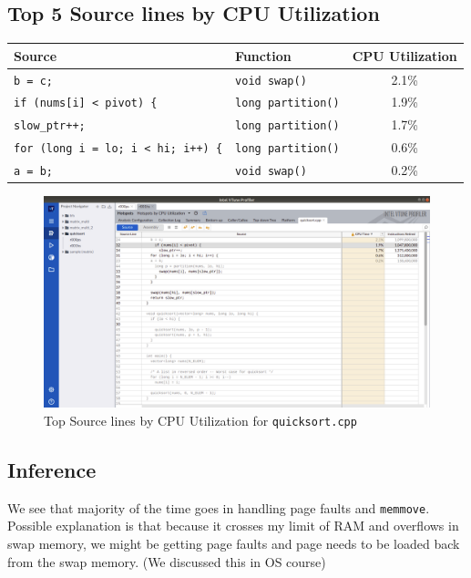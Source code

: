 \documentclass[11pt, swedish, openany]{book}
\begin{document}
\subsection*{Top 5 Source lines by CPU Utilization}
\begin{table}[H]
    \begin{tabular}{||l|l||c||}
        \hline
        Source                                     & Function                  & CPU Utilization \\
        \hline
        \texttt{b = c;}                            & \texttt{void swap()}      & 2.1\%           \\
        \texttt{if (nums[i] < pivot) \{}           & \texttt{long partition()} & 1.9\%           \\
        \texttt{slow\_ptr++;}                      & \texttt{long partition()} & 1.7\%           \\
        \texttt{for (long i = lo; i < hi; i++) \{} & \texttt{long partition()} & 0.6\%           \\
        \texttt{a = b;}                            & \texttt{void swap()}      & 0.2\%           \\
        \hline
    \end{tabular}
\end{table}

\begin{figure}[H]
    \centering
    \includegraphics[scale=0.25]{vtune/quicksort/sc.png}
    \caption{Top Source lines by CPU Utilization for \texttt{quicksort.cpp}}
\end{figure}

\subsection*{Inference}
We see that majority of the time goes in handling page faults and \texttt{memmove}. Possible explanation is that because it crosses my limit of RAM and overflows in swap memory, we might be getting page faults and page needs to be loaded back from the swap memory. (We discussed this in OS course)
\end{document}
